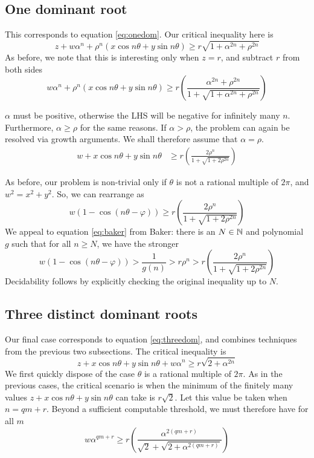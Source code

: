 \subsection{One dominant root}
This corresponds to equation \ref{eq:onedom}. Our critical inequality here is
\begin{equation}
z + w\alpha^n + \rho^n(x \cos n\theta + y \sin n \theta) \ge r\sqrt{1 + \alpha^{2n} + \rho^{2n}}
\end{equation}
As before, we note that this is interesting only when $z = r$, and subtract $r$ from both sides
\begin{equation}
w\alpha^n + \rho^n(x \cos n\theta + y \sin n \theta) \ge r\left(\frac{\alpha^{2n} + \rho^{2n}}{1 + \sqrt{1 + \alpha^{2n} + \rho^{2n}}}\right)
\end{equation}

$\alpha$ must be positive, otherwise the LHS will be negative for infinitely many $n$. Furthermore, $\alpha \ge \rho$ for the same reasons. If $\alpha > \rho$, the problem can again be resolved via growth arguments. We shall therefore assume that $\alpha = \rho$. 
\begin{align}
w + x \cos n\theta + y \sin n \theta &\ge r\left(\frac{2\rho^{n}}{1 + \sqrt{1 + 2\rho^{2n}}}\right)
\end{align}

As before, our problem is non-trivial only if $\theta$ is not a rational multiple of $2\pi$, and $w^2 = x^2 + y^2$. So, we can rearrange as 
\begin{equation}
w(1 - \cos(n\theta - \varphi)) \ge r\left(\frac{2\rho^{n}}{1 + \sqrt{1 + 2\rho^{2n}}}\right)
\end{equation}
We appeal to equation \ref{eq:baker} from Baker: there is an $N \in \mathbb{N}$ and polynomial $g$ such that for all $n \ge N$, we have the stronger
\begin{equation}
w(1 - \cos(n\theta - \varphi)) > \frac{1}{g(n)} > r \rho^n >  r\left(\frac{2\rho^{n}}{1 + \sqrt{1 + 2\rho^{2n}}}\right)
\end{equation}
Decidability follows by explicitly checking the original inequality up to $N$.

\subsection{Three distinct dominant roots}
Our final case corresponds to equation \ref{eq:threedom}, and combines techniques from the previous two subsections. The critical inequality is
\begin{equation}
z + x\cos n\theta + y\sin n\theta + w\alpha^n \ge r\sqrt{2 + \alpha^{2n}}
\end{equation}
We first quickly dispose of the case $\theta$ is a rational multiple of $2\pi$. As in the previous cases, the critical scenario is when the minimum of the finitely many values $z + x\cos n\theta + y\sin n\theta $ can take is $r\sqrt{2}$. Let this value be taken when $n = qm + r$. Beyond a sufficient computable threshold, we must therefore have for all $m$
\begin{equation}
w\alpha^{qm+r} \ge r\left(\frac{\alpha^{2(qm+r)}}{\sqrt{2}+ \sqrt{2+\alpha^{2(qm+r)}}}\right)
\end{equation}

